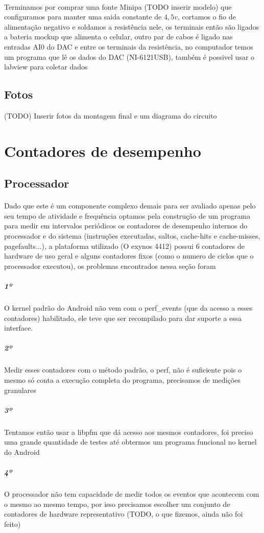 \documentclass[11pt,a4paper,titlepage]{article}
\begin{document}
\paragraph{} Terminamos por comprar uma fonte Minipa (TODO inserir modelo) que configuramos para manter uma saida constante de $4,5v$, cortamos o fio de alimentação negativo e soldamos a resistência nele, os terminais então são ligados a bateria mockup que alimenta o celular, outro par de cabos é ligado nas entradas AI0 do DAC e entre os terminais da resistência, no computador temos um programa que lê os dados do DAC (NI-6121USB), também é possivel usar o labview para coletar dados
\subsection{Fotos}
(TODO) Inserir fotos da montagem final e um diagrama do circuito
\section{Contadores de desempenho}
\subsection{Processador}
\paragraph{} Dado que este é um componente complexo demais para ser avaliado apenas pelo seu tempo de atividade e frequência optamos pela construção de um programa para medir em intervalos periódicos os contadores de desempenho internos do processador e do sistema (instruções executadas, saltos, cache-hits e cache-misses, pagefaults...), a plataforma utilizado (O exynos 4412) possui 6 contadores de hardware de uso geral e alguns contadores fixos (como o numero de ciclos que o processador executou), os problemas encontrados nessa seção foram
\subparagraph{1º} O kernel padrão do Android não vem com o perf\_events (que da acesso a esses contadores) habilitado, ele teve que ser recompilado para dar suporte a essa interface.
\subparagraph{2º} Medir esses contadores com o método padrão, o perf, não é suficiente pois o mesmo só conta a execução completa do programa, precisamos de medições granulares
\subparagraph{3º} Tentamos então usar a libpfm que dá acesso aos mesmos contadores, foi preciso uma grande quantidade de testes até obtermos um programa funcional no kernel do Android
\subparagraph{4º} O processador não tem capacidade de medir todos os eventos que acontecem com o mesmo ao mesmo tempo, por isso precisamos escolher um conjunto de contadores de hardware representativo (TODO, o que fizemos, ainda não foi feito)
\end{document}
